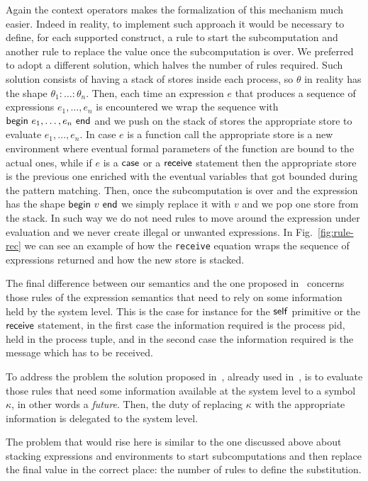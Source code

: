 \documentclass{article}[12pt,a4paper]
\theoremstyle{definition}
\begin{document}
Again the context operators makes the formalization of this mechanism
much easier. Indeed in reality, to implement such approach it would be necessary to define, for each supported construct, a rule to start the subcomputation and another rule to replace the
value once the subcomputation is over. We preferred to adopt a different
solution, which halves the number of rules required. Such solution consists of
having a stack of stores inside each process, so $\theta$ in reality has the
shape $\theta_1:\ldots:\theta_n$. Then, each
time an expression $e$ that produces a sequence of expressions $e_1,\ldots,e_n$ is encountered we wrap
the sequence with $\mathsf{begin}~e_1,\ldots,e_n~\mathsf{end}$ and we push on the stack of stores
the appropriate store to evaluate $e_1,\ldots,e_n$. In case $e$ is a function call the
appropriate store is a new environment where eventual formal parameters of
the function are bound to the actual ones, while if $e$ is a $\mathsf{case}$ or a
$\mathsf{receive}$ statement then the appropriate store is the previous one enriched
with the eventual variables that got bounded during the pattern matching. Then, once the
subcomputation is over and the expression has the shape $\mathsf{begin}~v~\mathsf{end}$ we simply replace it
with $v$ and we pop one store from the stack. In such way we do not need rules
to move around the expression under evaluation and we never create illegal or
unwanted expressions. In Fig.~\ref{fig:rule-rec} we can see an example of how the
\verb+receive+ equation wraps the sequence of expressions returned and how the
new store is stacked.

The final difference between our semantics and the one proposed
in~\cite{Gonzalez-AbrilV21} concerns those rules of the expression semantics
that need to rely on some information held by the system level. This is the case
for instance for the $\mathsf{self}$ primitive or the $\mathsf{receive}$ statement, in
the first case the information required is the process pid, held in the process
tuple, and in the second case the information required is the message which has
to be received.

To address the problem the solution proposed in~\cite{Gonzalez-AbrilV21},
already used in~\cite{LaneseNPV18}, is to evaluate those rules that need some information
available at the system level to a symbol $\kappa$, in other words a
\emph{future}. Then, the duty of replacing $\kappa$ with the
appropriate information is delegated to the system level.

The problem that would rise here is similar to the one discussed above about
stacking expressions and environments to start subcomputations and then replace
the final value in the correct place: the number of rules to define the substitution.
\end{document}
